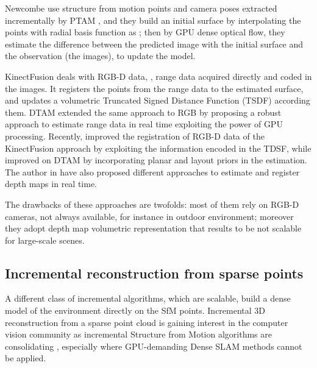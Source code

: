 Newcombe \etal \cite{newcombe2010live} use structure from motion points and camera poses extracted incrementally by PTAM \cite{klein_murray07}, and they build an initial surface by interpolating the points with radial basis function as \cite{ohtake2003multi}; then by GPU dense optical flow, they estimate the difference between the predicted image with the initial surface and the observation (the images), to update the model.

KinectFusion \cite{newcombe2011kinectfusion} deals with RGB-D data, \ie, range data acquired  directly and coded in the images. It registers the points from the range data to the estimated surface, and updates  a volumetric Truncated Signed Distance Function (TSDF) according them. DTAM \cite{newcombe2011dtam} extended the same approach to RGB by proposing a robust approach to estimate range data in real time exploiting the power of GPU processing.
Recently, \cite{bylow2013real} improved the registration of RGB-D data of the KinectFusion approach by exploiting the information encoded in the TDSF, while \cite{concha2015incorporating} improved on DTAM by incorporating planar and layout priors in the estimation. The author in \cite{stuhmer2012parallel,stuckler2014multi}  have also proposed different approaches to estimate and register depth maps in real time.

The drawbacks of these approaches are twofolds: most of them rely on RGB-D cameras, not always available, for instance in outdoor environment; moreover they adopt depth map  volumetric representation that results to be not scalable for large-scale scenes.  


\subsection{Incremental reconstruction from sparse points}
A different class of incremental algorithms, which are scalable, build a dense model of the environment directly on the SfM points.
Incremental 3D reconstruction from a sparse point cloud is gaining interest in the computer vision community as incremental Structure from Motion algorithms are consolidating  \cite{wu13}, especially where GPU-demanding Dense SLAM methods cannot be applied. 

